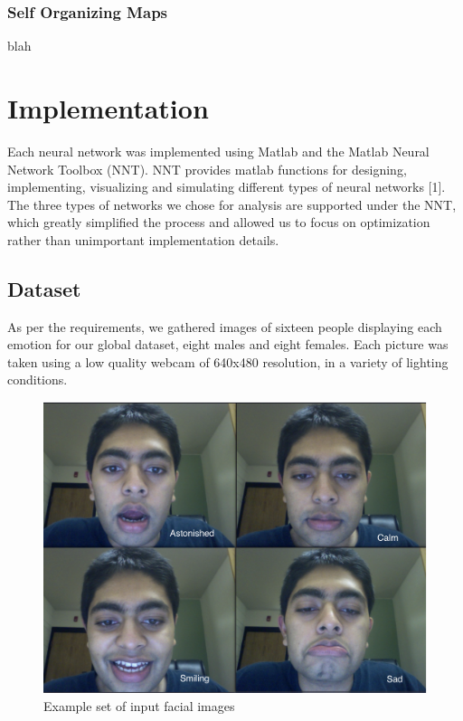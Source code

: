\documentclass[ece]{uw-wkrpt}
\begin{document}
\subsubsection{Self Organizing Maps} 
blah




\pagebreak

\section{Implementation}
Each neural network was implemented using Matlab and the Matlab Neural Network Toolbox (NNT). NNT provides matlab functions for designing, implementing, visualizing and simulating different types of neural networks [1]. The three types of networks we chose for analysis are supported under the NNT, which greatly simplified the process and allowed us to focus on optimization rather than unimportant implementation details.

\subsection{Dataset}
As per the requirements, we gathered images of sixteen people displaying each emotion for our global dataset, eight males and eight females. Each picture was taken using a low quality webcam of 640x480 resolution, in a variety of lighting conditions.

\begin{figure}
	\centering
		\includegraphics[scale=0.3]{sample.png}
	\caption{Example set of input facial images}
	\label{fig:binding}
\end{figure}
\end{document}
